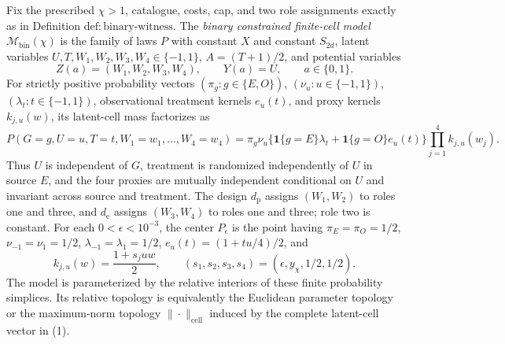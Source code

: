 Fix the prescribed \(\chi>1\), catalogue, costs, cap, and two role assignments exactly as in Definition \(\mathrm{def{:}binary\text{-}witness}\). The \emph{binary constrained finite-cell model} \(\mathcal M_{\mathrm{bin}}(\chi)\) is the family of laws \(P\) with constant \(X\) and constant \(S_{2d}\), latent variables \(U,T,W_1,W_2,W_3,W_4\in\{-1,1\}\), \(A=(T+1)/2\), and potential variables
\[
 Z(a)=(W_1,W_2,W_3,W_4),\qquad Y(a)=U,
 \qquad a\in\{0,1\}.
\]
For strictly positive probability vectors \((\pi_g:g\in\{E,O\})\), \((\nu_u:u\in\{-1,1\})\), \((\lambda_t:t\in\{-1,1\})\), observational treatment kernels \(e_u(t)\), and proxy kernels \(k_{j,u}(w)\), its latent-cell mass factorizes as
\[
 P(G=g,U=u,T=t,W_1=w_1,\ldots,W_4=w_4)
 =\pi_g\nu_u\bigl\{\mathbf 1\{g=E\}\lambda_t
 +\mathbf 1\{g=O\}e_u(t)\bigr\}
 \prod_{j=1}^4k_{j,u}(w_j). \tag{1}
\]
Thus \(U\) is independent of \(G\), treatment is randomized independently of \(U\) in source \(E\), and the four proxies are mutually independent conditional on \(U\) and invariant across source and treatment. The design \(d_{\mathrm p}\) assigns \((W_1,W_2)\) to roles one and three, and \(d_{\mathrm e}\) assigns \((W_3,W_4)\) to roles one and three; role two is constant. For each \(0<\epsilon<10^{-3}\), the center \(P_\epsilon\) is the point having \(\pi_E=\pi_O=1/2\), \(\nu_{-1}=\nu_1=1/2\), \(\lambda_{-1}=\lambda_1=1/2\), \(e_u(t)=(1+tu/4)/2\), and
\[
 k_{j,u}(w)=\frac{1+s_juw}{2},
 \qquad
 (s_1,s_2,s_3,s_4)=(\epsilon,y_{\chi},1/2,1/2).
\]
The model is parameterized by the relative interiors of these finite probability simplices. Its relative topology is equivalently the Euclidean parameter topology or the maximum-norm topology \(\|\cdot\|_{\mathrm{cell}}\) induced by the complete latent-cell vector in (1).